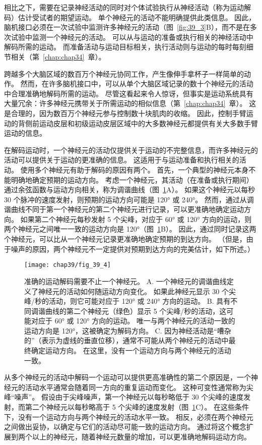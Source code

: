 相比之下，需要在记录神经活动的同时对个体试验执行从神经活动（称为运动解码）估计受试者的期望运动。
单个神经元的活动不能明确提供此类信息。
因此，脑机接口必须在一次试验中监测许多神经元的活动（图~\ref{fig:39_3}B），而不是在多次试验中监测一个神经元的活动。
可以从与运动的准备或执行相关的神经活动中解码所需的运动。
而准备活动与运动目标相关，执行活动则与运动的每时每刻细节相关（第~\ref{chap:chap34}~章）。


跨越多个大脑区域的数百万个神经元协同工作，产生像伸手拿杯子一样简单的动作。
然而，在许多脑机接口中，可以从单个大脑区域记录的数十个神经元的活动中合理准确地解码所需的运动。
尽管这看起来令人惊讶，但事实是运动系统具有大量冗余：许多神经元携带关于所需运动的相似信息（第~\ref{chap:chap34}~章）。
这是合理的，因为数百万个神经元参与控制数十块肌肉的收缩。
因此，控制手臂运动的背侧前运动皮层和初级运动皮层区域中的大多数神经元都提供有关大多数手臂运动的信息。


在解码运动时，一个神经元的活动仅提供关于运动的不完整信息，而许多神经元的活动可以提供关于运动的更准确的信息。
这适用于与运动准备和执行相关的活动。
使用多个神经元有助于解码的原因有两个。
首先，一个典型的神经元本身不能明确地确定预期的运动方向。
考虑一个神经元，其活动（在准备或执行期间）通过余弦函数与运动方向相关，称为调谐曲线（图~\ref{fig:39_4}A）。
如果这个神经元以每秒 30 个脉冲的速度发射，则预期的运动方向可能是 120° 或 240°。
然而，通过从调谐曲线不同于第一个神经元的第二个神经元进行记录，可以更准确地确定运动方向。
如果第二个神经元每秒发射 5 个尖峰，对应于 60° 或 120° 方向的运动，则两个神经元之间唯一一致的运动方向是 120°（图~\ref{fig:39_4}B）。
因此，通过同时记录这两个神经元，可以比从一个神经元记录更准确地确定预期的到达方向。
（但是，由于噪声的原因，两个神经元不一定提供对预期到达方向的完美估计，如下所述。）


\begin{figure}[htbp]
	\centering
	\texttt{[image: chap39/fig\_39\_4]}
	\caption{准确的运动解码需要不止一个神经元。
		A. 一个神经元的调谐曲线定义了神经元的活动如何随运动方向变化。
		如果此神经元显示 30 个尖峰/秒的活动，则它可能对应于 120° 或 240° 方向的运动。 
		B. 具有不同调谐曲线的第二个神经元（绿色）显示 5 个尖峰/秒的活动，这可能对应于 60° 或 120° 方向的运动。
		唯一与两个神经元的活动一致的运动方向是 120°，这被确定为解码方向。
		C. 因为神经活动是“嘈杂的”（表示为虚线的垂直位移），通常不可能从两个神经元的活动中最终确定运动方向。
		在这里，没有一个运动方向与两个神经元的活动一致。}
	\label{fig:39_4}
\end{figure}


从多个神经元的活动中解码一个运动可以提供更高准确性的第二个原因是，一个神经元的活动水平通常会随着同一方向的重复运动而变化。
这种可变性通常称为尖峰“噪声”。
假设由于尖峰噪声，第一个神经元以每秒略低于 30 个尖峰的速度发射，而第二个神经元以每秒略高于 5 个尖峰的速度发射（图~\ref{fig:39_4}C）。
在这些条件下，没有一个运动方向与两个神经元的活动水平一致。
相反，必须在两个神经元之间做出妥协，以确定与它们的活动尽可能一致的运动方向。
通过将这个概念扩展到两个以上的神经元，随着神经元数量的增加，可以更准确地解码运动方向。



